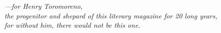 \vspace*{\fill}
\begin{center}
    \textit{
        ---for Henry Toromoreno,\\
        the progenitor and shepard of this literary magazine for 20 long years,\\
        for without him, there would not be this one.
    }
\end{center}
\vspace*{\fill}